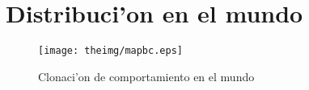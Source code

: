 \documentclass[11pt]{article}
\begin{document}
\section{Distribuci'on en el mundo}

\begin{figure}[h]

\centering

\texttt{[image: theimg/mapbc.eps]}

\caption[Clonaci'on de comportamiento en el mundo]{Clonaci'on de comportamiento en el mundo} 
\label{fig:bcmapa}

\end{figure}



\end{document}
